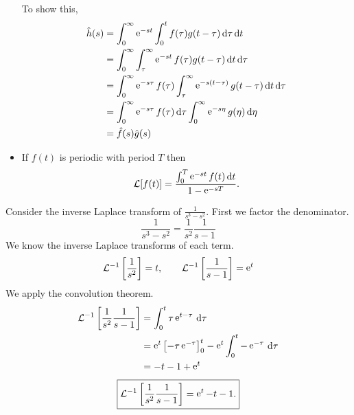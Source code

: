\begin{itemize}
  To show this,
  \begin{align*}
    \hat{h}(s)    
    &= \int_0^\infty \mathop{\mathrm{e}}\nolimits^{-s t} \int_0^t f(\tau)g(t-\tau)\,\mathrm{d} \tau \,\mathrm{d} t \\
    &= \int_0^\infty \int_\tau^\infty \mathop{\mathrm{e}}\nolimits^{-s t} f(\tau)g(t-\tau)\,\mathrm{d} t\,\mathrm{d} \tau\\
    &= \int_0^\infty \mathop{\mathrm{e}}\nolimits^{-s \tau}f(\tau) \int_\tau^\infty \mathop{\mathrm{e}}\nolimits^{-s(t-\tau)} g(t-\tau)\,\mathrm{d} t\,\mathrm{d} \tau \\
    &= \int_0^\infty \mathop{\mathrm{e}}\nolimits^{-s \tau}f(\tau) \,\mathrm{d} \tau \int_0^\infty \mathop{\mathrm{e}}\nolimits^{-s \eta}g(\eta)\,\mathrm{d} \eta \\
    &= \hat{f}(s) \hat{g}(s)
  \end{align*}


\item If $f(t)$ is periodic with period $T$ then
  \[ 
  \mathcal{L}[f(t)] = \frac{\int_0^T \mathop{\mathrm{e}}\nolimits^{-s t} f(t)\,\mathrm{d} t}{1-\mathop{\mathrm{e}}\nolimits^{-s T}}.
  \]
\end{itemize}















\begin{Example}
  Consider the inverse Laplace transform of $\frac{1}{s^3 - s^2}$.
  First we factor the denominator.
  \[ 
  \frac{1}{s^3 - s^2} = \frac{1}{s^2} \frac{1}{s-1} 
  \]
  We know the inverse Laplace transforms of each term.
  \[
  \mathcal{L}^{-1}\left[\frac{1}{s^2}\right] = t, \qquad
  \mathcal{L}^{-1}\left[\frac{1}{s-1}\right] = \mathop{\mathrm{e}}\nolimits^t
  \]
  We apply the convolution theorem.
  \begin{align*}
    \mathcal{L}^{-1}\left[\frac{1}{s^2} \frac{1}{s-1}\right]
    &= \int_0^t \tau \mathop{\mathrm{e}}\nolimits^{t-\tau}\,\mathrm{d} \tau \\
    &= \mathop{\mathrm{e}}\nolimits^t \left[-\tau \mathop{\mathrm{e}}\nolimits^{-\tau}\right]_0^t - \mathop{\mathrm{e}}\nolimits^t \int_0^t -\mathop{\mathrm{e}}\nolimits^{-\tau}\,\mathrm{d} \tau\\
    &= -t -1 + \mathop{\mathrm{e}}\nolimits^t
  \end{align*}
  \[ 
  \boxed{
    \mathcal{L}^{-1}\left[\frac{1}{s^2} \frac{1}{s-1}\right] = \mathop{\mathrm{e}}\nolimits^t-t-1.
    }
  \]
\end{Example}







